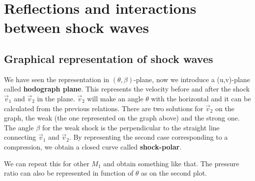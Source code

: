 
\chapter{Reflections and interactions between shock waves}
\section{Graphical representation of shock waves}
	We have seen the representation in $(\theta , \beta)$-plane, now we introduce a (u,v)-plane called \textbf{hodograph plane}. This represents the velocity before and after the shock $\vec{v}_1$ and $\vec{v}_2$ in the plane. $\vec{v}_2$ will make an angle $\theta$ with the horizontal and it can be calculated from the previous relations. There are two solutions for $\vec{v}_2$ on the graph, the weak  (the one represented on the graph above) and the strong one. The angle $\beta$ for the weak shock is the perpendicular to the straight line connecting $\vec{v}_1$ and $\vec{v}_2$. By representing the second case corresponding to a compression, we obtain a closed curve called \textbf{shock-polar}.
	
	We can repeat this for other $M_1$ and obtain something like that. The pressure ratio can also be represented in function of $\theta$ as on the second plot. 
	

